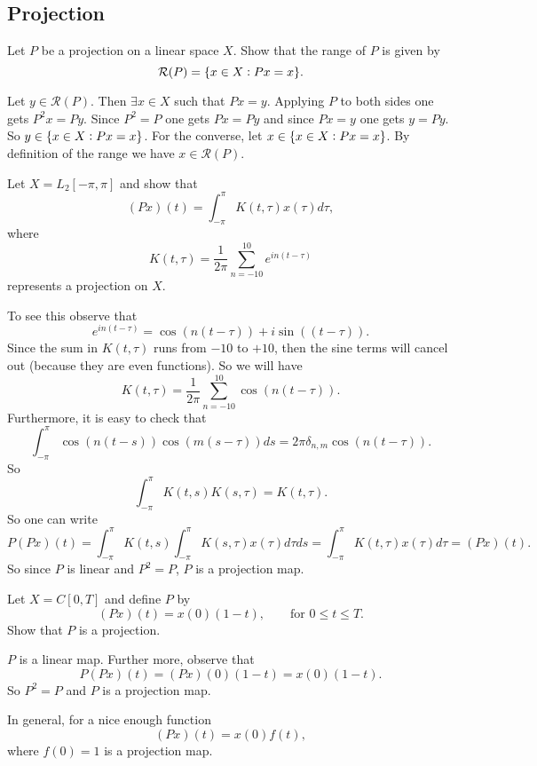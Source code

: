 \subsection{Projection}
\begin{problem}
	Let $ P $ be a projection on a linear space $ X $. Show that the range of $ P $ is given by
	\[ \mathcal{R}(P) = \{x\in X: Px=x\}. \]
\end{problem}
\begin{solution}
	Let $ y\in \mathcal{R}(P) $. Then $ \exists x\in X $ such that $ Px=  y $. Applying $ P $ to both sides one gets $ P^2x = Py $. Since $ P^2 = P $ one gets $ Px= Py $ and since $ Px = y $ one gets $ y = Py $. So $ y\in \{x\in X: Px=x\} $. For the converse, let $ x \in \{x\in X: Px=x\} $. By definition of the range we have $ x\in \mathcal{R}(P) $.
\end{solution}

\begin{problem}
	Let $ X = L_2[-\pi,\pi] $ and show that
	\[ (Px)(t) = \int_{-\pi}^\pi K(t,\tau)x(\tau) d\tau,  \]
	where 
	\[ K(t,\tau) = \frac{1}{2\pi} \sum_{n=-10}^{10} e^{in(t-\tau)} \]
	represents a projection on $ X $.
\end{problem}
\begin{solution}
	To see this observe that
	\[ e^{in(t-\tau)} = \cos(n(t-\tau)) + i\sin((t-\tau)). \]
	Since the sum in $ K(t,\tau) $ runs from $ -10 $ to $ +10 $, then the sine terms will cancel out (because they are even functions). So we will have
	\[ K(t,\tau) = \frac{1}{2\pi}\sum_{n=-10}^{10}\cos(n(t-\tau)). \]
	Furthermore, it is easy to check that
	\[ \int_{-\pi}^{\pi} \cos(n(t-s))\cos(m(s-\tau))  ds = 2\pi\delta_{n,m}\cos(n(t-\tau)).  \]
	So 
	\[ \int_{-\pi}^{\pi} K(t,s)K(s,\tau) = K(t,\tau) .\]
	So one can write
	\[ P(Px)(t) = \int_{-\pi}^{\pi} K(t,s) \int_{-\pi}^{\pi} K(s,\tau) x(\tau)d\tau ds = \int_{-\pi}^{\pi} K(t,\tau) x(\tau) d\tau = (Px)(t). \]
	So since $ P $ is linear and $ P^2 = P $, $ P $ is a projection map.
\end{solution}



\begin{problem}
	Let $ X = C[0,T] $ and define $ P $ by
	\[ (Px)(t) = x(0)(1-t), \qquad \text{for } 0\leq t\leq T. \]
	Show that $ P $ is a projection.
\end{problem}
\begin{solution}
	$ P $ is a linear map. Further more, observe that
	\[ P(Px)(t) = (Px)(0)(1-t) = x(0)(1-t). \]
	So $ P^2 = P $ and $ P $ is a projection map.
\end{solution}
\begin{remark}
	In general, for a nice enough function
	\[ (Px)(t) = x(0)f(t), \]
	where $ f(0) = 1 $ is a projection map.
\end{remark}
















